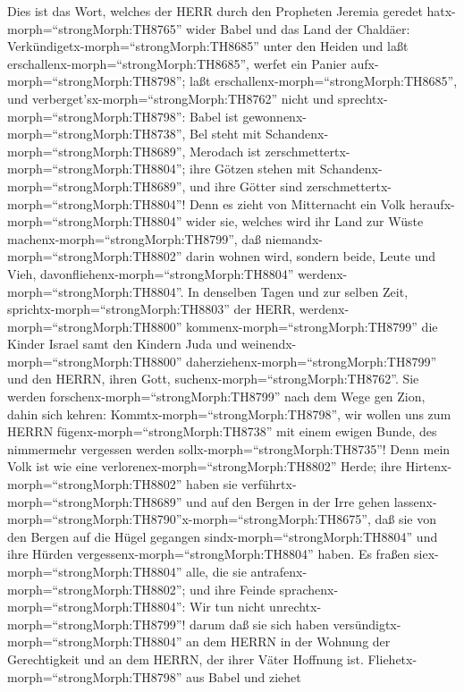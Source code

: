  Dies ist das Wort, welches der HERR durch den Propheten
Jeremia geredet hatx-morph=``strongMorph:TH8765'' wider Babel und das
Land der Chaldäer: 
Verkündigetx-morph=``strongMorph:TH8685'' unter den Heiden und laßt
erschallenx-morph=``strongMorph:TH8685'', werfet ein Panier
aufx-morph=``strongMorph:TH8798''; laßt
erschallenx-morph=``strongMorph:TH8685'', und
verberget'sx-morph=``strongMorph:TH8762'' nicht und
sprechtx-morph=``strongMorph:TH8798'': Babel ist
gewonnenx-morph=``strongMorph:TH8738'', Bel steht mit
Schandenx-morph=``strongMorph:TH8689'', Merodach ist
zerschmettertx-morph=``strongMorph:TH8804''; ihre Götzen stehen mit
Schandenx-morph=``strongMorph:TH8689'', und ihre Götter sind
zerschmettertx-morph=``strongMorph:TH8804''!  Denn es zieht
von Mitternacht ein Volk heraufx-morph=``strongMorph:TH8804'' wider sie,
welches wird ihr Land zur Wüste machenx-morph=``strongMorph:TH8799'',
daß niemandx-morph=``strongMorph:TH8802'' darin wohnen wird, sondern
beide, Leute und Vieh, davonfliehenx-morph=``strongMorph:TH8804''
werdenx-morph=``strongMorph:TH8804''.  In denselben Tagen
und zur selben Zeit, sprichtx-morph=``strongMorph:TH8803'' der HERR,
werdenx-morph=``strongMorph:TH8800''
kommenx-morph=``strongMorph:TH8799'' die Kinder Israel samt den Kindern
Juda und weinendx-morph=``strongMorph:TH8800''
daherziehenx-morph=``strongMorph:TH8799'' und den HERRN, ihren Gott,
suchenx-morph=``strongMorph:TH8762''.  Sie werden
forschenx-morph=``strongMorph:TH8799'' nach dem Wege gen Zion, dahin
sich kehren: Kommtx-morph=``strongMorph:TH8798'', wir wollen uns zum
HERRN fügenx-morph=``strongMorph:TH8738'' mit einem ewigen Bunde, des
nimmermehr vergessen werden sollx-morph=``strongMorph:TH8735''!
 Denn mein Volk ist wie eine
verlorenex-morph=``strongMorph:TH8802'' Herde; ihre
Hirtenx-morph=``strongMorph:TH8802'' haben sie
verführtx-morph=``strongMorph:TH8689'' und auf den Bergen in der Irre
gehen
lassenx-morph=``strongMorph:TH8790''\textbar x-morph=``strongMorph:TH8675'',
daß sie von den Bergen auf die Hügel gegangen
sindx-morph=``strongMorph:TH8804'' und ihre Hürden
vergessenx-morph=``strongMorph:TH8804'' haben.  Es fraßen
siex-morph=``strongMorph:TH8804'' alle, die sie
antrafenx-morph=``strongMorph:TH8802''; und ihre Feinde
sprachenx-morph=``strongMorph:TH8804'': Wir tun nicht
unrechtx-morph=``strongMorph:TH8799''! darum daß sie sich haben
versündigtx-morph=``strongMorph:TH8804'' an dem HERRN in der Wohnung der
Gerechtigkeit und an dem HERRN, der ihrer Väter Hoffnung ist.
 Fliehetx-morph=``strongMorph:TH8798'' aus Babel und ziehet
